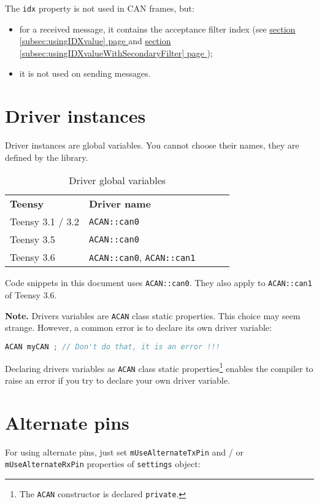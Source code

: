 \documentclass[10pt, a4paper, obeyspaces, openany]{extarticle}
\newcommand \sectionLabel[2]{\section{#1}\label{sec:#2}}
\newcommand\refSubsectionPage[1]{\hyperref[subsec:#1]{section \ref*{subsec:#1} page \pageref{subsec:#1}}}
\newcommand\labelTableau[1]{\label{tab:#1}}
\begin{document}
The \texttt{idx} property is not used in CAN frames, but:
\begin{itemize}
  \item for a received message, it contains the acceptance filter index (see \refSubsectionPage{usingIDXvalue} and \refSubsectionPage{usingIDXvalueWithSecondaryFilter});
  \item it is not used on sending messages.
\end{itemize}









\sectionLabel{Driver instances}{driverInstances}

Driver instances are global variables. You cannot choose their names, they are defined by the library.

\begin{table}[!ht]
  \small
  \onehalfspacing
  \centering
  \begin{tabular}{lllll}
    \textbf{Teensy}& \textbf{Driver name} \\
    Teensy 3.1 / 3.2 & \texttt{ACAN::can0}\\
    Teensy 3.5 &  \texttt{ACAN::can0}\\
    Teensy 3.6 &  \texttt{ACAN::can0}, \texttt{ACAN::can1}\\
   \end{tabular}
  \caption{Driver global variables}
  \labelTableau{varGlobalePiloteFlexCAN}
\end{table}

Code snippets in this document uses \texttt{ACAN::can0}. They also apply to \texttt{ACAN::can1} of Teensy 3.6.

{\bf Note.} Drivers variables are \texttt{ACAN} class static properties. This choice may seem strange. However, a common error is to declare its own driver variable: 
{ \small\begin{lstlisting}[language=c++]
ACAN myCAN ; // Don't do that, it is an error !!!
\end{lstlisting}}

Declaring drivers variables as \texttt{ACAN} class static properties\footnote{The \texttt{ACAN} constructor is declared \texttt{private}.} enables the compiler to raise an error if you try to declare your own driver variable.



\sectionLabel{Alternate pins}{alternatePins}

For using alternate pins, just set \texttt{mUseAlternateTxPin} and / or \texttt{mUseAlternateRxPin} properties of \texttt{settings} object:
\end{document}
